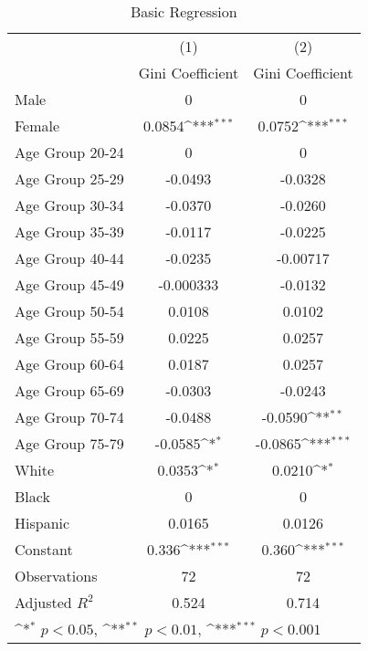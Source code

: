 \begin{table}[htbp]\centering
\def\sym#1{\ifmmode^{#1}\else\(^{#1}\)\fi}
\caption{Basic Regression\label{reg1}}
\begin{tabular}{l*{2}{c}}
\hline\hline
                    &\multicolumn{1}{c}{(1)}&\multicolumn{1}{c}{(2)}\\
                    &\multicolumn{1}{c}{Gini Coefficient}&\multicolumn{1}{c}{Gini Coefficient}\\
\hline
Male                &           0         &           0         \\
Female              &      0.0854\sym{***}&      0.0752\sym{***}\\
Age Group 20-24     &           0         &           0         \\
Age Group 25-29     &     -0.0493         &     -0.0328         \\
Age Group 30-34     &     -0.0370         &     -0.0260         \\
Age Group 35-39     &     -0.0117         &     -0.0225         \\
Age Group 40-44     &     -0.0235         &    -0.00717         \\
Age Group 45-49     &   -0.000333         &     -0.0132         \\
Age Group 50-54     &      0.0108         &      0.0102         \\
Age Group 55-59     &      0.0225         &      0.0257         \\
Age Group 60-64     &      0.0187         &      0.0257         \\
Age Group 65-69     &     -0.0303         &     -0.0243         \\
Age Group 70-74     &     -0.0488         &     -0.0590\sym{**} \\
Age Group 75-79     &     -0.0585\sym{*}  &     -0.0865\sym{***}\\
White               &      0.0353\sym{*}  &      0.0210\sym{*}  \\
Black               &           0         &           0         \\
Hispanic            &      0.0165         &      0.0126         \\
Constant            &       0.336\sym{***}&       0.360\sym{***}\\
\hline
Observations        &          72         &          72         \\
Adjusted \(R^{2}\)  &       0.524         &       0.714         \\
\hline\hline
\multicolumn{3}{l}{\footnotesize \sym{*} \(p<0.05\), \sym{**} \(p<0.01\), \sym{***} \(p<0.001\)}\\
\end{tabular}
\end{table}

